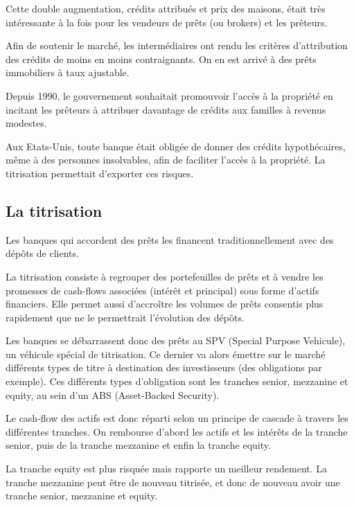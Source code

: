 	Cette double augmentation, crédits attribués et prix des maisons, était très intéressante à la fois pour les vendeurs de prêts (ou brokers) et les prêteurs. 

	Afin de soutenir le marché, les intermédiaires ont rendu les critères 
d'attribution des crédits de moins en moins contraignants. On en est arrivé à des prêts immobiliers à taux ajustable.

	Depuis 1990, le gouvernement souhaitait promouvoir l'accès à la propriété en incitant les prêteurs à attribuer davantage de crédits aux familles à revenus modestes.

	Aux Etats-Unis, toute banque était obligée de donner des crédits hypothécaires, même à des personnes insolvables, afin de faciliter l'accès à la propriété. La titrisation permettait d'exporter ces risques.
	
	\subsection{La titrisation}
	
	Les banques qui accordent des prêts les financent traditionnellement avec des dépôts de clients. 

	La titrisation consiste à regrouper des portefeuilles de prêts et à vendre les promesses de cash-flows associées (intérêt et principal) sous forme d'actifs financiers. Elle permet aussi d'accroître les volumes de prêts consentis plus rapidement que ne le permettrait l'évolution des dépôts. 
	
	
	Les banques se débarrassent donc des prêts au SPV (Special Purpose Vehicule), un véhicule spécial de titrisation. Ce dernier va alors émettre sur le marché différents types de titre à destination des investisseurs (des obligations par exemple). Ces différents types d'obligation sont les tranches senior, mezzanine et equity, au sein d'un ABS (Asset-Backed Security).
	
	Le cash-flow des actifs est donc réparti selon un principe de cascade à travers les différentes tranches. On rembourse d'abord les actifs et les intérêts de la tranche senior, puis de la tranche mezzanine et enfin la tranche equity. 
	
	La tranche equity est plus risquée mais rapporte un meilleur rendement. La tranche mezzanine peut être de nouveau titrisée, et donc de nouveau avoir une tranche senior, mezzanine et equity.
	
	
